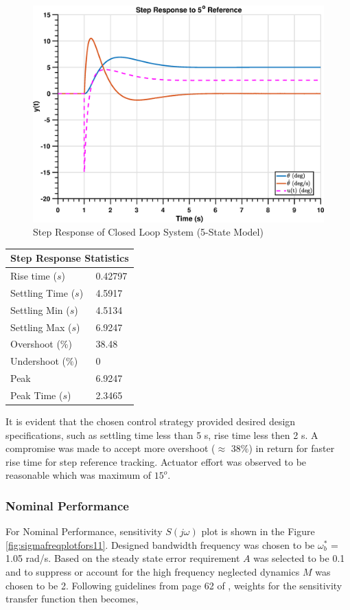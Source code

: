 \documentclass[12pt]{article}
\begin{document}
	\begin{figure}[H]
		\centering
		\includegraphics[width=0.8\linewidth]{LaunchVehicle_StepResponse}
		\caption{Step Response of Closed Loop System (5-State Model)}
		\label{fig:model5statespistepresponse}
	\end{figure}
	\begin{center}
		\begin{tabular}{ |p{4cm}|p{2.4cm}| }
			\hline
			\multicolumn{2}{|c|}{Step Response Statistics} \\
			\hline
			Rise time ($s$)& 0.42797 \\
			Settling Time ($s$)& 4.5917 \\
			Settling Min ($s$)& 4.5134\\
			Settling Max ($s$)& 6.9247\\
			Overshoot ($\%$) & 38.48 \\
			Undershoot ($\%$) & 0\\
			Peak & 6.9247\\
			Peak Time ($s$)& 2.3465\\
			\hline
		\end{tabular}
	\end{center}
	\noindent It is evident that the chosen control strategy provided desired design specifications, such as settling time less than 5 s, rise time less then 2 s. A compromise was made to accept more overshoot ($\approx$ 38$\%$) in return for faster rise time for step reference tracking. Actuator effort was observed to be reasonable which was maximum of $15^{o}$.
	
	\subsubsection{Nominal Performance}
	For Nominal Performance, sensitivity $S(j\omega)$ plot is shown in the Figure \ref{fig:sigmafreqplotfors11}.  Designed bandwidth frequency was chosen to be $\omega_b^*$ = 1.05 rad/s. Based on the steady state error requirement $A$ was selected to be 0.1 and to suppress or account for the high frequency neglected dynamics $M$ was chosen to be 2. Following guidelines from page 62 of \cite{cite3}, weights for the sensitivity transfer function then becomes, 
	
\end{document}
